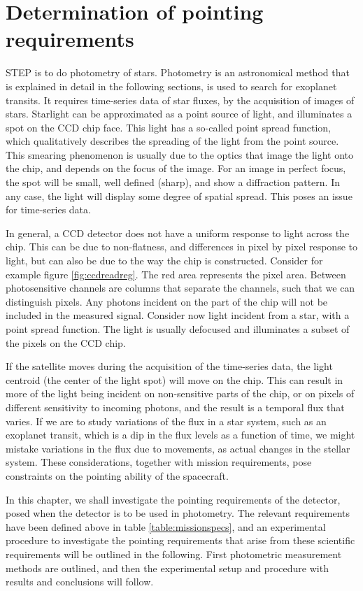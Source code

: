 \documentclass[../main.tex]{subfiles}
\begin{document}
	
\chapter{Determination of pointing requirements}

STEP is to do photometry of stars. Photometry is an astronomical method that is explained in detail in the following sections, is used to search for exoplanet transits. It requires time-series data of star fluxes, by the acquisition of images of stars. Starlight can be approximated as a point source of light, and illuminates a spot on the CCD chip face. This light has a so-called point spread function, which qualitatively describes the spreading of the light from the point source. This smearing phenomenon is usually due to the optics that image the light onto the chip, and depends on the focus of the image. For an image in perfect focus, the spot will be small, well defined (sharp), and show a diffraction pattern. In any case, the light will display some degree of spatial spread. This poses an issue for time-series data.

In general, a CCD detector does not have a uniform response to light across the chip. This can be due to non-flatness, and differences in pixel by pixel response to light, but can also be due to the way the chip is constructed. Consider for example figure \ref{fig:ccdreadreg}. The red area represents the pixel area. Between photosensitive channels are columns that separate the channels, such that we can distinguish pixels. Any photons incident on the part of the chip will not be included in the measured signal. Consider now light incident from a star, with a point spread function. The light is usually defocused and illuminates a subset of the pixels on the CCD chip. 

If the satellite moves during the acquisition of the time-series data, the light centroid (the center of the light spot) will move on the chip. This can result in more of the light being incident on non-sensitive parts of the chip, or on pixels of different sensitivity to incoming photons, and the result is a temporal flux that varies. If we are to study variations of the flux in a star system, such as an exoplanet transit, which is a dip in the flux levels as a function of time, we might mistake variations in the flux due to movements, as actual changes in the stellar system. These considerations, together with mission requirements, pose constraints on the pointing ability of the spacecraft.

In this chapter, we shall investigate the pointing requirements of the detector, posed when the detector is to be used in photometry. The relevant requirements have been defined above in table \ref{table:missionspecs}, and an experimental procedure to investigate the pointing requirements that arise from these scientific requirements will be outlined in the following. First photometric measurement methods are outlined, and then the experimental setup and procedure with results and conclusions will follow.
\end{document}
